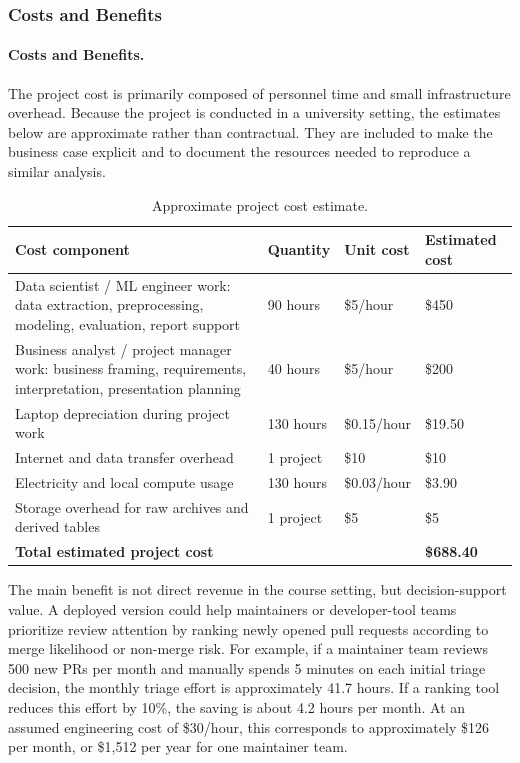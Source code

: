 \subsubsection*{Costs and Benefits}

\paragraph{Costs and Benefits.}
The project cost is primarily composed of personnel time and small infrastructure overhead.
Because the project is conducted in a university setting, the estimates below are approximate
rather than contractual. They are included to make the business case explicit and to document
the resources needed to reproduce a similar analysis.

\begin{table}[H]
    \centering
    \caption{Approximate project cost estimate.}
    \begin{tabular}{p{}p{}p{}p{}}
        \toprule
        Cost component & Quantity & Unit cost & Estimated cost \\
        \midrule
        Data scientist / ML engineer work: data extraction, preprocessing, modeling, evaluation, report support
        & 90 hours & \$5/hour & \$450 \\
        Business analyst / project manager work: business framing, requirements, interpretation, presentation planning
        & 40 hours & \$5/hour & \$200 \\
        Laptop depreciation during project work
        & 130 hours & \$0.15/hour & \$19.50 \\
        Internet and data transfer overhead
        & 1 project & \$10 & \$10 \\
        Electricity and local compute usage
        & 130 hours & \$0.03/hour & \$3.90 \\
        Storage overhead for raw archives and derived tables
        & 1 project & \$5 & \$5 \\
        \midrule
        \textbf{Total estimated project cost} & & & \textbf{\$688.40} \\
        \bottomrule
    \end{tabular}
\end{table}

The main benefit is not direct revenue in the course setting, but decision-support value.
A deployed version could help maintainers or developer-tool teams prioritize review attention
by ranking newly opened pull requests according to merge likelihood or non-merge risk. For
example, if a maintainer team reviews 500 new PRs per month and manually spends 5 minutes
on each initial triage decision, the monthly triage effort is approximately 41.7 hours. If a ranking
tool reduces this effort by 10\%, the saving is about 4.2 hours per month. At an assumed
engineering cost of \$30/hour, this corresponds to approximately \$126 per month, or \$1,512 per
year for one maintainer team.

